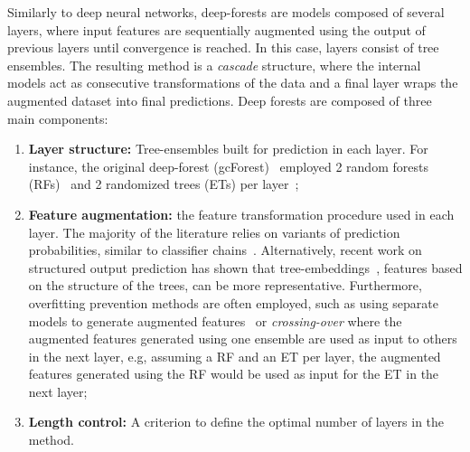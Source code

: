 \documentclass[conference,compsoc]{IEEEtran}
\begin{document}
%
Similarly to deep neural networks, deep-forests are models composed of several layers, where input features are sequentially augmented using the output of previous layers until convergence is reached. In this case, layers consist of tree ensembles. The resulting method is a \emph{cascade} structure, where the internal models act as consecutive transformations of the data and a final layer wraps the augmented dataset into final predictions. Deep forests are composed of three main components: 
\begin{enumerate}
    \item \textbf{Layer structure:}  Tree-ensembles built for prediction in each layer. For instance, the original deep-forest (gcForest)~\cite{zhou2019deep} employed 2 random forests (RFs)~\cite{breiman2001random} and 2 randomized trees (ETs) per layer~\cite{geurts2006extremely}; 

    \item \textbf{Feature augmentation:} the feature transformation procedure used in each layer. The majority of the literature relies on variants of prediction probabilities, similar to classifier chains~\cite{read2021classifier}. Alternatively, recent work on structured output prediction has shown that tree-embeddings~\cite{nakano2022deep}, features based on the structure of the trees, can be more representative. Furthermore, overfitting prevention methods are often employed, such as using separate models to generate augmented features~\cite{nakano2022deep,wang2020learning} or  
    \textit{crossing-over} where the augmented features generated using one ensemble are used as input to others in the next layer, e.g, assuming a RF and an ET per layer, the augmented features generated using the RF would be used as input for the ET in the next layer;

    \item \textbf{Length control:} A criterion to define the optimal number of layers in the method.
\end{enumerate}

\end{document}
